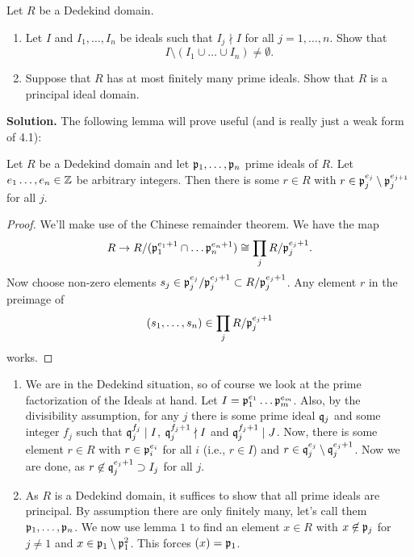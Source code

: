 \documentclass[a4paper,11pt]{article}
\begin{document}
Let $R$ be a Dedekind domain.
\begin{enumerate}
    \item Let $I$ and $I_1, \dots, I_n$ be ideals such that 
        $I_j \nmid I$ for all $j = 1, \dots, n$. Show that 
        \begin{equation*}
            I\setminus(I_1 \cup \dots \cup I_n) \neq \emptyset.
        \end{equation*}
    \item Suppose that $R$ has at most finitely many prime ideals. 
        Show that $R$ is a principal ideal domain.
\end{enumerate}
\textbf{Solution.}
The following lemma will prove useful (and is really just a weak form of 
4.1):
\begin{lem}\label{lem:1}
    Let $R$ be a Dedekind domain and let $\mathfrak{p}_1, \dots, \mathfrak{p}_n$ prime ideals of $R$.
    Let $e_1 \dots, e_n \in \mathbb{Z}$ be arbitrary integers. Then there is some 
    $r \in R$ with $r \in \mathfrak{p}_j^{e_j}\setminus \mathfrak{p}_j^{e_{j+1}}$ for all $j$. 
\begin{proof}
    We'll make use of the Chinese remainder theorem. We have the map
    \begin{equation*}
        R \to R/(\mathfrak{p}_1^{e_1+1} \cap \dots \mathfrak{p}_n^{e_n+1}) \cong
        \prod_j R/\mathfrak{p}_j^{e_j+1}.
    \end{equation*}
    Now choose non-zero elements $s_j \in \mathfrak{p}_j^{e_j}/\mathfrak{p}_j^{e_j+1} \subset
    R/\mathfrak{p}_j^{e_j+1}$. Any element $r$ in the preimage of 
    \begin{equation*}
        (s_1, \dots, s_n) \in \prod_j R/\mathfrak{p}_j^{e_j+1}
    \end{equation*}
    works.
\end{proof}
\end{lem}
\begin{enumerate}
    \item We are in the Dedekind situation, so of course we look at the prime
        factorization of the Ideals at hand. Let 
        $I = \mathfrak{p}_1^{e_1} \dots \mathfrak{p}_m^{e_m}$. Also, by the divisibility
        assumption, for 
        any $j$ there is some prime ideal $\mathfrak{q}_j$ and some integer $f_j$ 
        such that $\mathfrak{q}_j^{f_j} \mid I$, $\mathfrak{q}_j^{f_j+1} \nmid I$ and 
        $\mathfrak{q}_j^{f_j+1} \mid J$. Now, there is some element 
        $r \in R$ with $r \in \mathfrak{p}_i^{e_i}$ for all $i$ (i.e., $r \in I$) and 
        $r \in \mathfrak{q}_j^{e_j}\setminus\mathfrak{q}_j^{e_j+1}$. Now we are done, as
        $r \not \in \mathfrak{q}_j^{e_j+1} \supset I_j$ for all $j$. 

    \item As $R$ is a Dedekind domain, it suffices to show that all
        prime ideals are principal. By assumption there are only finitely many,
        let's call them $\mathfrak{p}_1, \dots, \mathfrak{p}_n$. We now use lemma $1$ to find an
        element $x \in R$ with $x \not \in \mathfrak{p}_j$ for $j \neq 1$ and 
        $x \in \mathfrak{p}_1 \setminus\mathfrak{p}_1^2$. This forces $(x) = \mathfrak{p}_1$. 
\end{enumerate}

\contactend
\end{document}
